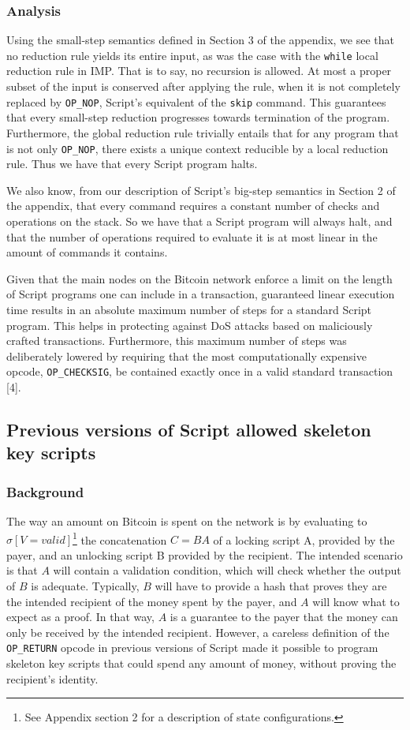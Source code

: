 \documentclass[letterpaper, 10 pt, conference]{ieeeconf}
\begin{document}
\subsubsection{Analysis}
Using the small-step semantics defined in Section 3 of the appendix, we see that no reduction rule yields its entire input, as was the case with the \texttt{while} local reduction rule in IMP. That is to say, no recursion is allowed. At most a proper subset of the input is conserved after applying the rule, when it is not completely replaced by \texttt{OP\_NOP}, Script's equivalent of the \texttt{skip} command. This guarantees that every small-step reduction progresses towards termination of the program. Furthermore, the global reduction rule trivially entails that for any program that is not only \texttt{OP\_NOP}, there exists a unique context reducible by a local reduction rule. Thus we have that every Script program halts.

We also know, from our description of Script's big-step semantics in Section 2 of the appendix, that every command requires a constant number of checks and operations on the stack. So we have that a Script program will always halt, and that the number of operations required to evaluate it is at most linear in the amount of commands it contains.

Given that the main nodes on the Bitcoin network enforce a limit on the length of Script programs one can include in a transaction, guaranteed linear execution time results in an absolute maximum number of steps for a standard Script program. This helps in protecting against DoS attacks based on maliciously crafted transactions. Furthermore, this maximum number of steps was deliberately lowered by requiring that the most computationally expensive opcode, \texttt{OP\_CHECKSIG}, be contained exactly once in a valid standard transaction [4].


\subsection{Previous versions of Script allowed skeleton key scripts}

\subsubsection{Background}
The way an amount on Bitcoin is spent on the network is by evaluating to $\sigma[V=valid]$\footnote{See Appendix section 2 for a description of state configurations.} the concatenation $C = BA$ of a locking script A, provided by the payer, and an unlocking script B provided by the recipient. The intended scenario is that $A$ will contain a validation condition, which will check whether the output of $B$ is adequate. Typically, $B$ will have to provide a hash that proves they are the intended recipient of the money spent by the payer, and $A$ will know what to expect as a proof. In that way, $A$ is a guarantee to the payer that the money can only be received by the intended recipient. However, a careless definition of the \texttt{OP\_RETURN} opcode in previous versions of Script made it possible to program skeleton key scripts that could spend any amount of money, without proving the recipient's identity.
\end{document}
